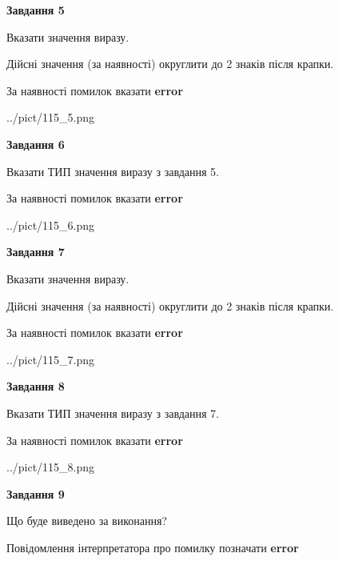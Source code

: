 \documentclass[11pt, ukrainian]{article}
\begin{document}
{\begin {large}
{\begin {center}\textbf{Завдання 5}\end {center}}\par
Вказати значення виразу. \par
Дійсні значення (за наявності) округлити до 2 знаків після крапки. \par
За наявності помилок вказати \textbf{error}

\begin{center}
	{../pict/115_5.png}
\end{center}
\newpage

{\begin {center}\textbf{Завдання 6}\end {center}}\par
Вказати ТИП значення виразу з завдання 5. \par
За наявності помилок вказати \textbf{error}

\begin{center}
	{../pict/115_6.png}
\end{center}
\newpage

{\begin {center}\textbf{Завдання 7}\end {center}}\par
Вказати значення виразу. \par
Дійсні значення (за наявності) округлити до 2 знаків після крапки. \par
За наявності помилок вказати \textbf{error}

\begin{center}
	{../pict/115_7.png}
\end{center}
\newpage

{\begin {center}\textbf{Завдання 8}\end {center}}\par
Вказати ТИП значення виразу з завдання 7. \par
За наявності помилок вказати \textbf{error}

\begin{center}
	{../pict/115_8.png}
\end{center}
\newpage

{\begin {center}\textbf{Завдання 9}\end {center}}\par
Що буде виведено за виконання? \par
Повідомлення інтерпретатора про помилку позначати \textbf{error}


\end{large}}
\end{document}
